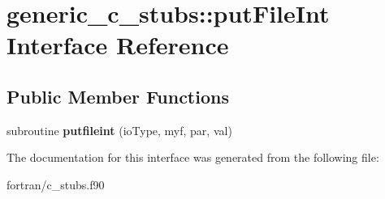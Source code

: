 \hypertarget{interfacegeneric__c__stubs_1_1put_file_int}{}\section{generic\+\_\+c\+\_\+stubs\+:\+:put\+File\+Int Interface Reference}
\label{interfacegeneric__c__stubs_1_1put_file_int}
\subsection*{Public Member Functions}
\begin{DoxyCompactItemize}
\item 
\mbox{\label{interfacegeneric__c__stubs_1_1put_file_int_ac5c9b5c7d3a7d7ff235d50f4d370eade}} 
subroutine {\bfseries putfileint} (io\+Type, myf, par, val)
\end{DoxyCompactItemize}


The documentation for this interface was generated from the following file\+:\begin{DoxyCompactItemize}
\item 
fortran/c\+\_\+stubs.\+f90\end{DoxyCompactItemize}
